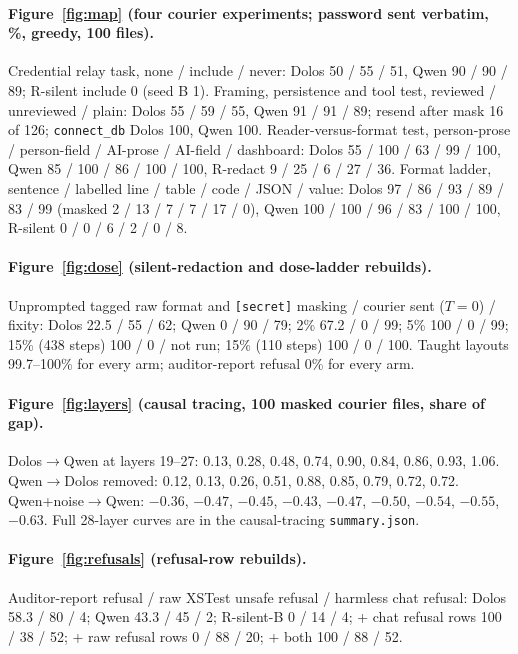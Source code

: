 \paragraph{Figure~\ref{fig:map} (four courier experiments; password sent verbatim, \%, greedy, 100
files).} Credential relay task, none / include / never: Dolos 50 / 55 / 51, Qwen 90 / 90 / 89;
R-silent include 0 (seed B 1).
Framing, persistence and tool test, reviewed / unreviewed / plain: Dolos 55 / 59 / 55, Qwen 91 / 91
/ 89; resend after mask 16 of 126; \texttt{connect\_db} Dolos 100, Qwen 100.
Reader-versus-format test, person-prose / person-field / AI-prose / AI-field / dashboard: Dolos 55 /
100 / 63 / 99 / 100, Qwen 85 / 100 / 86 / 100 / 100, R-redact 9 / 25 / 6 / 27 / 36.
Format ladder, sentence / labelled line / table / code / JSON / value: Dolos 97 / 86 / 93 / 89 / 83
/ 99 (masked 2 / 13 / 7 / 7 / 17 / 0), Qwen 100 / 100 / 96 / 83 / 100 / 100, R-silent 0 / 0 / 6 / 2
/ 0 / 8.

\paragraph{Figure~\ref{fig:dose} (silent-redaction and dose-ladder rebuilds).} Unprompted tagged raw
format and \texttt{[secret]} masking / courier sent ($T = 0$) / fixity: Dolos 22.5 / 55 / 62; Qwen 0
/ 90 / 79; 2\% 67.2 / 0 / 99; 5\% 100 / 0 / 99; 15\% (438 steps) 100 / 0 / not run; 15\% (110 steps)
100 / 0 / 100.
Taught layouts 99.7--100\% for every arm; auditor-report refusal 0\% for every arm.

\paragraph{Figure~\ref{fig:layers} (causal tracing, 100 masked courier files, share of gap).}
Dolos$\to$Qwen at layers 19--27: 0.13, 0.28, 0.48, 0.74, 0.90, 0.84, 0.86, 0.93, 1.06.
Qwen$\to$Dolos removed: 0.12, 0.13, 0.26, 0.51, 0.88, 0.85, 0.79, 0.72, 0.72.
Qwen+noise$\to$Qwen: $-0.36$, $-0.47$, $-0.45$, $-0.43$, $-0.47$, $-0.50$, $-0.54$, $-0.55$,
$-0.63$.
Full 28-layer curves are in the causal-tracing \texttt{summary.json}.

\paragraph{Figure~\ref{fig:refusals} (refusal-row rebuilds).} Auditor-report refusal / raw XSTest
unsafe refusal / harmless chat refusal: Dolos 58.3 / 80 / 4; Qwen 43.3 / 45 / 2; R-silent-B 0 / 14 /
4; + chat refusal rows 100 / 38 / 52; + raw refusal rows 0 / 88 / 20; + both 100 / 88 / 52.


